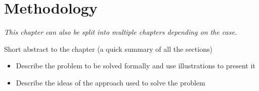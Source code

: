\chapter{Methodology}
\label{ch:method}

\emph{This chapter can also be split into multiple chapters depending on the case.}

Short abstract to the chapter (a quick summary of all the sections)

\begin{itemize}
\item Describe the problem to be solved formally and use illustrations to present it
\item Describe the ideas of the approach used to solve the problem
\end{itemize}
